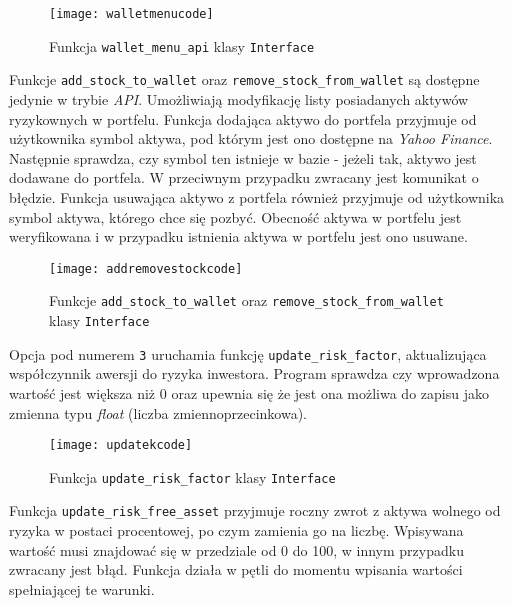 \documentclass[magister]{dyplom}
\def\code#1{\texttt{#1}}
\begin{document}
\begin{figure}[ht]
	\centering
	\texttt{[image: walletmenucode]}
	\caption{Funkcja \code{wallet\_menu\_api} klasy \code{Interface}}
\end{figure}

Funkcje \code{add\_stock\_to\_wallet} oraz \code{remove\_stock\_from\_wallet} są dostępne jedynie w trybie \textit{API}. Umożliwiają modyfikację listy posiadanych aktywów ryzykownych w portfelu. Funkcja dodająca aktywo do portfela przyjmuje od użytkownika symbol aktywa, pod którym jest ono dostępne na \textit{Yahoo Finance}. Następnie sprawdza, czy symbol ten istnieje w bazie - jeżeli tak, aktywo jest dodawane do portfela. W przeciwnym przypadku zwracany jest komunikat o błędzie.
Funkcja usuwająca aktywo z portfela również przyjmuje od użytkownika symbol aktywa, którego chce się pozbyć. Obecność aktywa w portfelu jest weryfikowana i w przypadku istnienia aktywa w portfelu jest ono usuwane.

\begin{figure}[ht]
	\centering
	\texttt{[image: addremovestockcode]}
	\caption{Funkcje \code{add\_stock\_to\_wallet} oraz \code{remove\_stock\_from\_wallet} klasy \code{Interface}}
\end{figure}

Opcja pod numerem \code{3} uruchamia funkcję \code{update\_risk\_factor}, aktualizująca współczynnik awersji do ryzyka inwestora. Program sprawdza czy wprowadzona wartość jest większa niż $0$ oraz upewnia się że jest ona możliwa do zapisu jako zmienna typu \textit{float} (liczba zmiennoprzecinkowa).

\begin{figure}[ht]
	\centering
	\texttt{[image: updatekcode]}
	\caption{Funkcja \code{update\_risk\_factor} klasy \code{Interface}}
\end{figure}

Funkcja \code{update\_risk\_free\_asset} przyjmuje roczny zwrot z aktywa wolnego od ryzyka w postaci procentowej, po czym zamienia go na liczbę. Wpisywana wartość musi znajdować się w przedziale od 0 do 100, w innym przypadku zwracany jest błąd. Funkcja działa w pętli do momentu wpisania wartości spełniającej te warunki.
\end{document}
